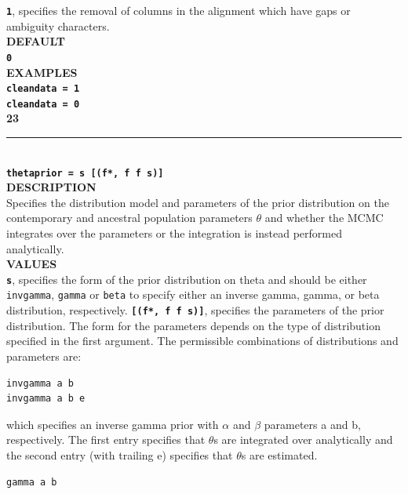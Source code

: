 \documentclass[a4paper]{book}
\numberwithin{equation}{section} \renewcommand{\baselinestretch}{0.55}
\begin{document}
\textbf{\texttt{1}}, specifies the removal of columns in the alignment
which have gaps or ambiguity
characters. \vspace{5pt}\\
\textbf{DEFAULT} \vspace{5pt}\\
\textbf{\texttt{0}} \vspace{5pt}\\
\textbf{EXAMPLES} \vspace{5pt}\\
\textbf{\texttt{cleandata = 1}} \vspace{5pt}\\
\textbf{\texttt{cleandata = 0}}\vspace{10pt}\\
\textbf{{\large 23}} \\
\noindent\rule{\textwidth}{0.8pt} \\
\textbf{{\Large \texttt{thetaprior =  s [(f*, f f s)] }}} \vspace{5pt}\\
\textbf{DESCRIPTION} \vspace{5pt}\\
Specifies the distribution model and parameters of the prior
distribution on the contemporary and ancestral population parameters
$\theta$ and whether the MCMC integrates over the parameters or the
integration is instead performed analytically.
\vspace{5pt}\\
\textbf{VALUES} \vspace{5pt}\\
\textbf{\texttt{s}}, specifies the form of the prior distribution
on theta and should be either \texttt{invgamma}, \texttt{gamma} or
\texttt{beta} to specify either an inverse gamma, gamma, or beta
distribution, respectively.
\textbf{\texttt{[(f*, f f s)]}}, specifies the parameters of the prior
distribution. The form for the parameters depends on the type of distribution specified
in the first argument. The permissible combinations of distributions and parameters
are:
\begin{verbatim}
invgamma a b
invgamma a b e
\end{verbatim}
which specifies an inverse gamma prior with $\alpha$ and $\beta$ parameters a and b, respectively. The first entry specifies
that $\theta$s are integrated over analytically and the second entry (with trailing e) specifies that $\theta$s are estimated.
\begin{verbatim}
gamma a b
\end{verbatim}
\end{document}
